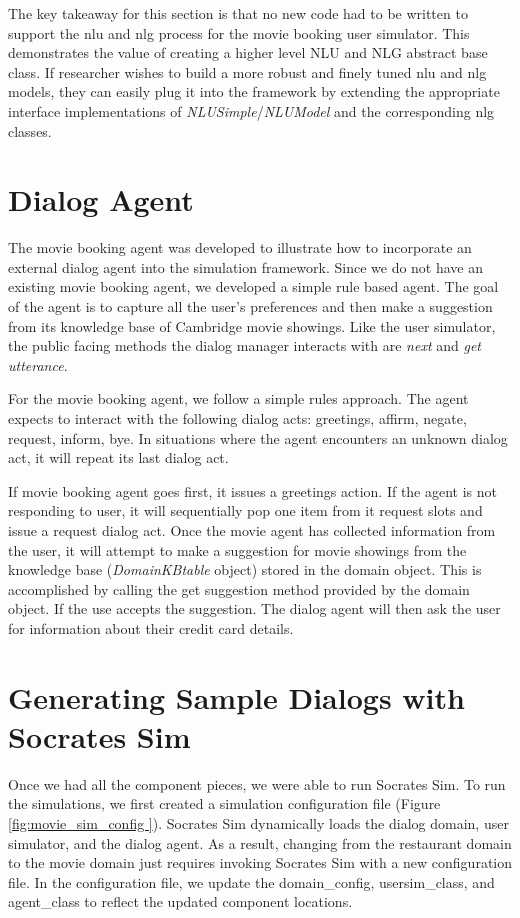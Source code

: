 The key takeaway for this section is that no new code had to be written to support the nlu and nlg process for the movie booking user simulator. This demonstrates the value of creating a higher level NLU  and NLG abstract base class. If researcher wishes to build a more robust and finely tuned nlu and nlg models, they can easily plug it into the framework by extending the appropriate interface implementations of \textit{NLUSimple}/\textit{NLUModel} and the corresponding nlg classes. 

\section{Dialog Agent}

The movie booking agent was developed to illustrate how to incorporate an external dialog agent into the simulation framework. Since we do not have an existing movie booking agent, we developed a simple rule based agent. The goal of the agent is to capture all the user's preferences and then make a suggestion from its knowledge base of Cambridge movie showings. Like the user simulator, the public facing methods the dialog manager interacts with are \textit{next} and \textit{get utterance}. 

For the movie booking agent, we follow a simple rules approach. The agent expects to interact with the following dialog acts: greetings, affirm, negate, request, inform, bye. In situations where the agent encounters an unknown dialog act, it will repeat its last dialog act. 

If movie booking agent goes first, it issues a greetings action. If the agent is not responding to user, it will sequentially pop one item from it request slots and issue a request dialog act. Once the movie agent has collected information from the user, it will attempt to make a suggestion for movie showings from the knowledge base (\textit{DomainKBtable} object)  stored in the domain object. This is accomplished by calling the get suggestion method provided by the domain object. If the use accepts the suggestion. The dialog agent will then ask the user for information about their credit card details.

\section{Generating Sample Dialogs with Socrates Sim}

Once we had all the component pieces, we were able to run Socrates Sim. To run the simulations, we first created a simulation configuration file (Figure \ref{fig:movie_sim_config }). Socrates Sim dynamically loads the dialog domain, user simulator, and the dialog agent. As a result, changing from the restaurant domain to the movie domain just requires invoking Socrates Sim with a new configuration file. In the configuration file, we update the domain\_config, usersim\_class, and agent\_class to reflect the updated component locations. 

